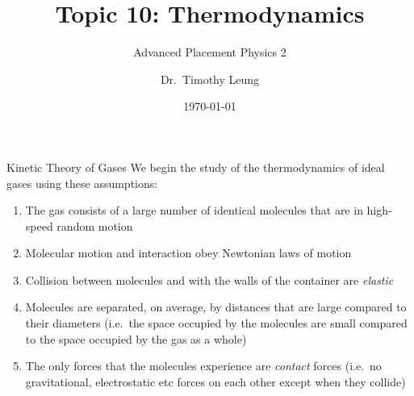 \documentclass[12pt,aspectratio=169]{beamer}
\title{Topic 10: Thermodynamics}
\subtitle{Advanced Placement Physics 2}
\author[TML]{Dr.\ Timothy Leung}
\institute{Olympiads School\\Toronto, ON, Canada}
\date{\today}
\begin{document}
\begin{frame}
  \maketitle
\end{frame}



%



\begin{frame}{Kinetic Theory of Gases}
  We begin the study of the thermodynamics of ideal gases using these
  assumptions:
  \begin{enumerate}
  \item The gas consists of a large number of identical molecules that are in
    high-speed random motion
  \item Molecular motion and interaction obey Newtonian laws of motion
  \item Collision between molecules and with the walls of the container are
    \emph{elastic}
  \item Molecules are separated, on average, by distances that are large
    compared to their diameters (i.e.\ the space occupied by the molecules are
    small compared to the space occupied by the gas as a whole)
  \item The only forces that the molecules experience are \emph{contact} forces
    (i.e.\ no gravitational, electrostatic etc forces on each other except when
    they collide)
  \end{enumerate}
\end{frame}
\end{document}
